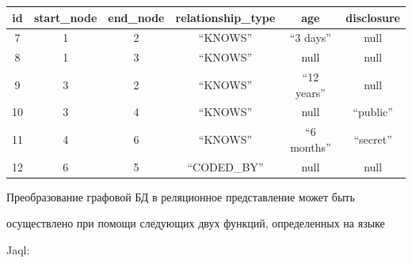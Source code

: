 \begin{table}
{\begin{center}
       \begin{tabular}{|c|c|c|c|c|c|}

       \hline

id&start\_node&end\_node&relationship\_type&age&disclosure\\

\hline

\hphantom{9}7&1&2&``KNOWS''&``3 days''&null\\

\hphantom{9}8&1&3&``KNOWS''&null&null\\

\hphantom{9}9&3&2&``KNOWS''&``12 years''&null\\

10&3&4&``KNOWS''&null&``public''\\

11&4&6&``KNOWS''&``6 months''&``secret''\\

12&6&5&``CODED\_BY''&null&null\\

\hline

\end{tabular}

\end{center}}

       \vspace*{-12pt}

\end{table}



      Преобразование графовой БД в реляционное представление может быть

осуществлено при помощи следующих двух функций, определенных на языке

Jaql:

